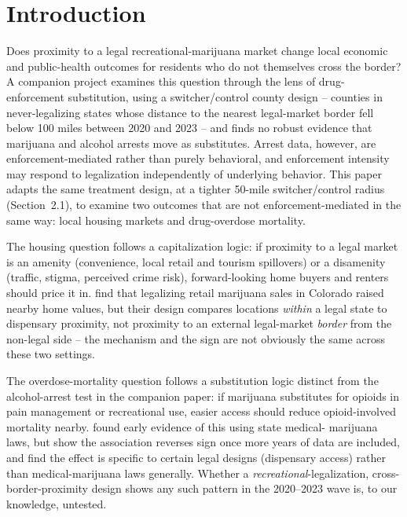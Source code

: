 \documentclass[11pt]{article}
\begin{document}
\begin{titlepage}
\vspace{0.5cm}
\end{titlepage}

\section{Introduction}

Does proximity to a legal recreational-marijuana market change local
economic and public-health outcomes for residents who do not
themselves cross the border? A companion project examines this
question through the lens of drug-enforcement substitution, using a
switcher/control county design -- counties in never-legalizing states
whose distance to the nearest legal-market border fell below 100 miles
between 2020 and 2023 -- and finds no robust evidence that marijuana
and alcohol arrests move as substitutes. Arrest data, however, are
enforcement-mediated rather than purely behavioral, and enforcement
intensity may respond to legalization independently of underlying
behavior. This paper adapts the same treatment design, at a tighter
50-mile switcher/control radius (Section~2.1), to examine two outcomes
that are not enforcement-mediated in the same way: local housing
markets and drug-overdose mortality.

The housing question follows a capitalization logic: if proximity to a
legal market is an amenity (convenience, local retail and tourism
spillovers) or a disamenity (traffic, stigma, perceived crime risk),
forward-looking home buyers and renters should price it in.
\citet{ChengMayerMayer2018} find that legalizing retail marijuana
sales in Colorado raised nearby home values, but their design compares
locations \emph{within} a legal state to dispensary proximity, not
proximity to an external legal-market \emph{border} from the
non-legal side -- the mechanism and the sign are not obviously the
same across these two settings.

The overdose-mortality question follows a substitution logic
distinct from the alcohol-arrest test in the companion paper: if
marijuana substitutes for opioids in pain management or recreational
use, easier access should reduce opioid-involved mortality nearby.
\citet{Bachhuber2014} found early evidence of this using state medical-
marijuana laws, but \citet{Shover2019} show the association reverses
sign once more years of data are included, and \citet{PowellPaculaJacobson2018}
find the effect is specific to certain legal designs (dispensary
access) rather than medical-marijuana laws generally. Whether a
\emph{recreational}-legalization, cross-border-proximity design shows
any such pattern in the 2020--2023 wave is, to our knowledge,
untested.
\end{document}
